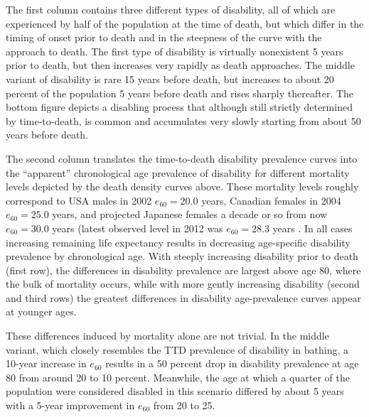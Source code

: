 \documentclass[11pt,oneside,a4paper]{article} %
\begin{document}
The first column contains three different types of disability, all of which are
experienced by half of the population at the time of death, but which differ in
the timing of onset prior to death and in the steepness of the curve with the
approach to death.
The first type of disability is virtually nonexistent 5 years prior to death, but then increases very rapidly as death approaches. The middle variant of disability is rare 15 years before death, but increases to about 20 percent of the population 5 years before death and rises sharply thereafter. The bottom figure depicts a disabling process that although still strictly determined by time-to-death, is common and accumulates very slowly starting from about 50 years before death.

The second column translates the time-to-death disability prevalence curves into
the ``apparent'' chronological age prevalence of disability for different
mortality levels depicted by the death density curves above. These mortality
levels roughly correspond to USA males in 2002 $e_{60} = 20.0$ years, Canadian
females in 2004 $e_{60} = 25.0$ years, and projected Japanese females a decade
or so from now $e_{60} = 30.0$ years (latest observed level in 2012 was $e_{60}
= 28.3$ years \citep{HMD2015}. In all cases increasing remaining life
expectancy results in decreasing age-specific disability prevalence by
chronological age. With steeply increasing disability prior to death (first
row), the differences in disability prevalence are largest above age 80, where
the bulk of mortality occurs, while with more gently increasing disability
(second and third rows) the greatest differences in disability age-prevalence
curves appear at younger ages.

These differences induced by mortality alone are not trivial. In the middle variant, which closely resembles the TTD prevalence of disability in bathing, a 10-year increase in $e_{60}$ results in a 50 percent drop in disability prevalence at age 80 from around 20 to 10 percent. Meanwhile, the age at which a quarter of the population were considered disabled in this scenario differed by about 5 years with a 5-year improvement in $e_{60}$ from 20 to 25.



\end{document}
